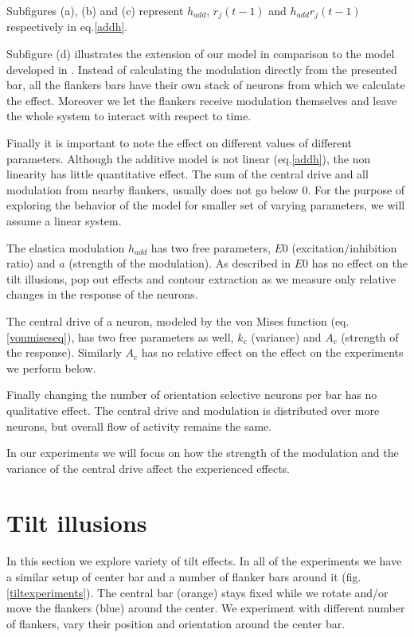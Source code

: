 Subfigures (a), (b) and (c) represent $h_{add}$, $r_{j}(t-1)$ and $h_{add}r_{j}(t-1)$ respectively in eq.\ref{addh}.

Subfigure (d) illustrates the extension of our model in comparison to the model developed in \cite{keemink2015unified}. Instead of calculating the modulation directly from the presented bar, all the flankers bars have their own stack of neurons from which we calculate the effect. Moreover we let the flankers receive modulation themselves and leave the whole system to interact with respect to time.

Finally it is important to note the effect on different values of different parameters. Although the additive model is not linear (eq.\ref{addh}), the non linearity has little quantitative effect. The sum of the central drive and all modulation from nearby flankers, usually does not go below $0$. For the purpose of exploring the behavior of the model for smaller set of varying parameters, we will assume a linear system. 

The elastica modulation $h_{add}$ has two free parameters, $E0$ (excitation/inhibition ratio) and $a$ (strength of the modulation). As described in \cite{keemink2015unified} $E0$ has no effect on the tilt illusions, pop out effects and contour extraction as we measure only relative changes in the response of the neurons. 

The central drive of a neuron, modeled by the von Mises function (eq.\ref{vonmiseseq}), has two free parameters as well, $k_{c}$ (variance) and $A_{c}$ (strength of the response). Similarly $A_{c}$ has no relative effect on the effect on the experiments we perform below.

Finally changing the number of orientation selective neurons per bar has no qualitative effect. The central drive and modulation is distributed over more neurons, but overall flow of activity remains the same.

In our experiments we will focus on how the strength of the modulation and the variance of the central drive affect the experienced effects.
\section{Tilt illusions}

In this section we explore variety of tilt effects. In all of the experiments we have a similar setup of center bar and a number of flanker bars around it (fig.\ref{tiltexperiments}). The central bar (orange) stays fixed while we rotate and/or move the flankers (blue) around the center. We experiment with different number of flankers, vary their position and orientation around the center bar.

